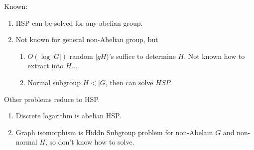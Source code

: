 Known:

\begin{enumerate}
\item HSP can be solved for any abelian group.
\item Not known for general non-Abelian group, but
  \begin{enumerate}
  \item $O(\log |G|)$ random $| gH \rangle$'s suffice to determine
    $H$.  Not known how to extract into $H$...
  \item Normal subgroup $H <| G$, then can solve $HSP$.
  \end{enumerate}
\end{enumerate}

Other problems reduce to HSP.

\begin{enumerate}
\item Discrete logarithm is abelian HSP.
\item Graph isomorphism is Hiddn Subgroup problem for non-Abelain $G$
  and non-normal $H$, so don't know how to solve.
\end{enumerate}



